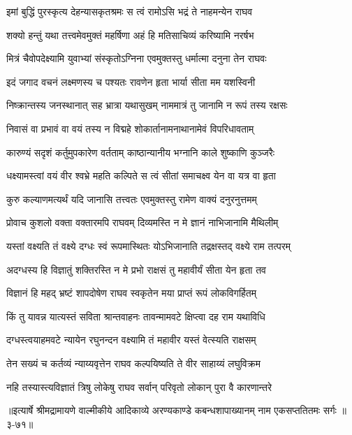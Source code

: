 \twolineshloka
{इमां बुद्धिं पुरस्कृत्य देहन्यासकृतश्रमः}
{स त्वं रामोऽसि भद्रं ते नाहमन्येन राघव} %

\twolineshloka
{शक्यो हन्तुं यथा तत्त्वमेवमुक्तं महर्षिणा}
{अहं हि मतिसाचिव्यं करिष्यामि नरर्षभ} %

\twolineshloka
{मित्रं चैवोपदेक्ष्यामि युवाभ्यां संस्कृतोऽग्निना}
{एवमुक्तस्तु धर्मात्मा दनुना तेन राघवः} %

\twolineshloka
{इदं जगाद वचनं लक्ष्मणस्य च पश्यतः}
{रावणेन हृता भार्या सीता मम यशस्विनी} %

\twolineshloka
{निष्क्रान्तस्य जनस्थानात् सह भ्रात्रा यथासुखम्}
{नाममात्रं तु जानामि न रूपं तस्य रक्षसः} %

\twolineshloka
{निवासं वा प्रभावं वा वयं तस्य न विद्महे}
{शोकार्तानामनाथानामेवं विपरिधावताम्} %

\twolineshloka
{कारुण्यं सदृशं कर्तुमुपकारेण वर्तताम्}
{काष्ठान्यानीय भग्नानि काले शुष्काणि कुञ्जरैः} %

\twolineshloka
{धक्ष्यामस्त्वां वयं वीर श्वभ्रे महति कल्पिते}
{स त्वं सीतां समाचक्ष्व येन वा यत्र वा हृता} %

\twolineshloka
{कुरु कल्याणमत्यर्थं यदि जानासि तत्त्वतः}
{एवमुक्तस्तु रामेण वाक्यं दनुरनुत्तमम्} %

\twolineshloka
{प्रोवाच कुशलो वक्ता वक्तारमपि राघवम्}
{दिव्यमस्ति न मे ज्ञानं नाभिजानामि मैथिलीम्} %

\twolineshloka
{यस्तां वक्ष्यति तं वक्ष्ये दग्धः स्वं रूपमास्थितः}
{योऽभिजानाति तद्रक्षस्तद् वक्ष्ये राम तत्परम्} %

\twolineshloka
{अदग्धस्य हि विज्ञातुं शक्तिरस्ति न मे प्रभो}
{राक्षसं तु महावीर्यं सीता येन हृता तव} %

\twolineshloka
{विज्ञानं हि महद् भ्रष्टं शापदोषेण राघव}
{स्वकृतेन मया प्राप्तं रूपं लोकविगर्हितम्} %

\twolineshloka
{किं तु यावन्न यात्यस्तं सविता श्रान्तवाहनः}
{तावन्मामवटे क्षिप्त्वा दह राम यथाविधि} %

\twolineshloka
{दग्धस्त्वयाहमवटे न्यायेन रघुनन्दन}
{वक्ष्यामि तं महावीर यस्तं वेत्स्यति राक्षसम्} %

\twolineshloka
{तेन सख्यं च कर्तव्यं न्याय्यवृत्तेन राघव}
{कल्पयिष्यति ते वीर साहाय्यं लघुविक्रम} %

\twolineshloka
{नहि तस्यास्त्यविज्ञातं त्रिषु लोकेषु राघव}
{सर्वान् परिवृतो लोकान् पुरा वै कारणान्तरे} %


॥इत्यार्षे श्रीमद्रामायणे वाल्मीकीये आदिकाव्ये अरण्यकाण्डे कबन्धशापाख्यानम् नाम एकसप्ततितमः सर्गः ॥३-७१॥
